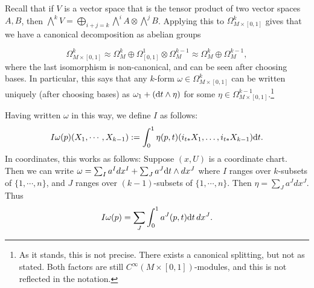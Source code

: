 \documentclass[11pt, english]{article}
\begin{document}
Recall that if $V$ is a vector space that is the tensor product of two vector spaces $A,B$, then $\bigwedge^k V = \bigoplus_{i+j=k} \bigwedge^i A \otimes \bigwedge^j B$. Applying this to $\Omega_{M \times [0,1]}^k$ gives that we have a canonical decomposition as abelian groups

\[
\Omega_{M \times [0,1]}^k \approx \Omega_M^k \oplus \Omega_{[0,1]}^1 \otimes \Omega_M^{k-1} \approx \Omega_M^k \oplus \Omega_M^{k-1},
\]
where the last isomorphism is non-canonical, and can be seen after choosing bases. In particular, this says that any $k$-form $\omega \in \Omega_{M \times [0,1]}^k$ can be written uniquely (after choosing bases) as $\omega_1 + (\mathrm{d}{t} \wedge \eta)$ for some $\eta \in \Omega_{M \times [0,1]}^{k-1}$.\footnote{As it stands, this is not precise. There exists a canonical splitting, but not as stated. Both factors are still $C^\infty(M \times [0,1])$-modules, and this is not reflected in the notation.} 

Having written $\omega$ in this way, we define $I$ as follows:
\[
I\omega(p)(X_1,\cdots,X_{k-1}) := \int_0^1 \eta(p,t)(i_{t\ast} X_1,\ldots, i_{t\ast}X_{k-1}) \mathrm{d}{t}.
\]
In coordinates, this works as follows: Suppose $(x,U)$ is a coordinate chart. Then we can write $\omega= \sum_I a^I dx^I + \sum_J a^J \mathrm{d}{t} \wedge dx^J$ where $I$ ranges over $k$-subsets of $\{1,\cdots,n\}$, and $J$ ranges over $(k-1)$-subsets of $\{1,\cdots, n\}$. Then $\eta=\sum_J a^J dx^J$. Thus
\[
I\omega(p) = \sum_J \int_0^1 a^J(p,t) \mathrm{d}{t} \, dx^J.
\]
\end{document}
